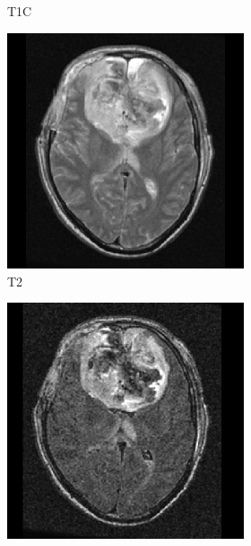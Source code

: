 \begin{figure}[htbp]
\begin{subfigure}[b]{\textwidth}
\begin{subfigure}[b]{0.24\textwidth}
    \caption*{\acrshort{T1C}\nopunct}
    \end{subfigure}
    \hfill
    \begin{subfigure}[b]{0.24\textwidth}
    \includegraphics[width=\textwidth, clip, trim=2.5cm 0.5cm 2.5cm 0.5cm]{Figures/TCGA-DU-6410_T2.png}
    \caption*{\acrshort{T2}\nopunct}
    \end{subfigure}
    \hfill
    \begin{subfigure}[b]{0.24\textwidth}
    \includegraphics[width=\textwidth, clip, trim=2.5cm 0.5cm 2.5cm 0.5cm]{Figures/TCGA-DU-6410_FLAIR.png}

\end{subfigure}
\end{subfigure}
\end{figure}
